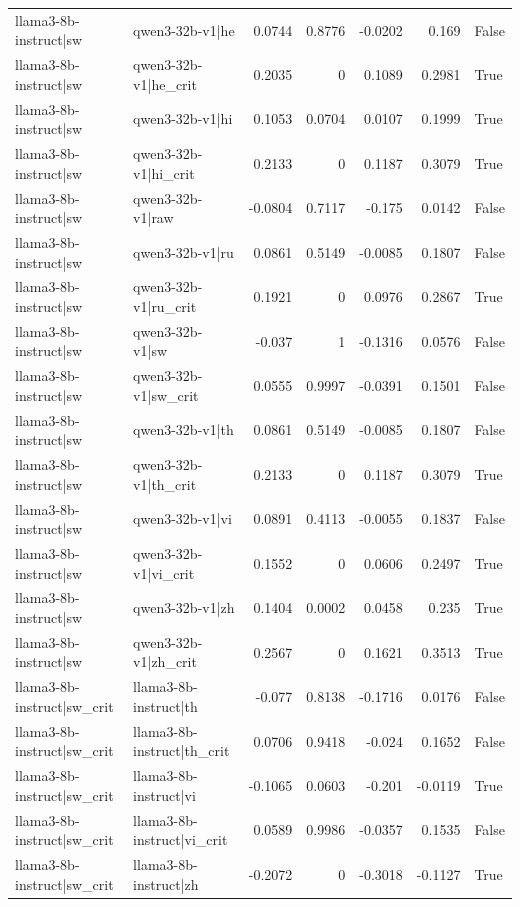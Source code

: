 \begin{table}
\begin{tabular}{l l r r r r l}
llama3-8b-instruct|sw & qwen3-32b-v1|he & 0.0744 & 0.8776 & -0.0202 & 0.169 & False \\
llama3-8b-instruct|sw & qwen3-32b-v1|he_crit & 0.2035 & 0 & 0.1089 & 0.2981 & True \\
llama3-8b-instruct|sw & qwen3-32b-v1|hi & 0.1053 & 0.0704 & 0.0107 & 0.1999 & True \\
llama3-8b-instruct|sw & qwen3-32b-v1|hi_crit & 0.2133 & 0 & 0.1187 & 0.3079 & True \\
llama3-8b-instruct|sw & qwen3-32b-v1|raw & -0.0804 & 0.7117 & -0.175 & 0.0142 & False \\
llama3-8b-instruct|sw & qwen3-32b-v1|ru & 0.0861 & 0.5149 & -0.0085 & 0.1807 & False \\
llama3-8b-instruct|sw & qwen3-32b-v1|ru_crit & 0.1921 & 0 & 0.0976 & 0.2867 & True \\
llama3-8b-instruct|sw & qwen3-32b-v1|sw & -0.037 & 1 & -0.1316 & 0.0576 & False \\
llama3-8b-instruct|sw & qwen3-32b-v1|sw_crit & 0.0555 & 0.9997 & -0.0391 & 0.1501 & False \\
llama3-8b-instruct|sw & qwen3-32b-v1|th & 0.0861 & 0.5149 & -0.0085 & 0.1807 & False \\
llama3-8b-instruct|sw & qwen3-32b-v1|th_crit & 0.2133 & 0 & 0.1187 & 0.3079 & True \\
llama3-8b-instruct|sw & qwen3-32b-v1|vi & 0.0891 & 0.4113 & -0.0055 & 0.1837 & False \\
llama3-8b-instruct|sw & qwen3-32b-v1|vi_crit & 0.1552 & 0 & 0.0606 & 0.2497 & True \\
llama3-8b-instruct|sw & qwen3-32b-v1|zh & 0.1404 & 0.0002 & 0.0458 & 0.235 & True \\
llama3-8b-instruct|sw & qwen3-32b-v1|zh_crit & 0.2567 & 0 & 0.1621 & 0.3513 & True \\
llama3-8b-instruct|sw_crit & llama3-8b-instruct|th & -0.077 & 0.8138 & -0.1716 & 0.0176 & False \\
llama3-8b-instruct|sw_crit & llama3-8b-instruct|th_crit & 0.0706 & 0.9418 & -0.024 & 0.1652 & False \\
llama3-8b-instruct|sw_crit & llama3-8b-instruct|vi & -0.1065 & 0.0603 & -0.201 & -0.0119 & True \\
llama3-8b-instruct|sw_crit & llama3-8b-instruct|vi_crit & 0.0589 & 0.9986 & -0.0357 & 0.1535 & False \\
llama3-8b-instruct|sw_crit & llama3-8b-instruct|zh & -0.2072 & 0 & -0.3018 & -0.1127 & True \\

\end{tabular}
\end{table}
